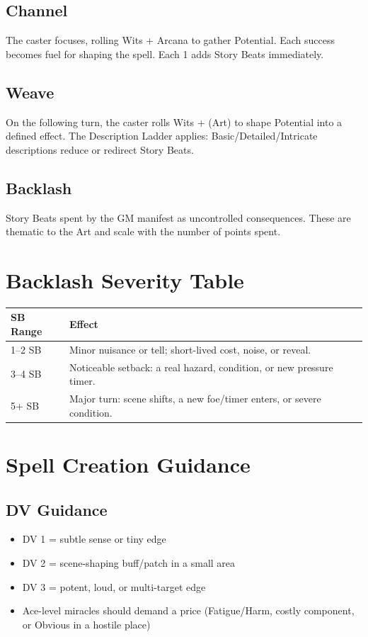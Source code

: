 \documentclass[11pt]{report}
\begin{document}
\subsection{Channel}
The caster focuses, rolling Wits + Arcana to gather Potential. Each success becomes fuel for shaping the spell. Each 1 adds Story Beats immediately.

\subsection{Weave}
On the following turn, the caster rolls Wits + (Art) to shape Potential into a defined effect. The Description Ladder applies: Basic/Detailed/Intricate descriptions reduce or redirect Story Beats.

\subsection{Backlash}
Story Beats spent by the GM manifest as uncontrolled consequences. These are thematic to the Art and scale with the number of points spent.

\section{Backlash Severity Table}

\begin{tabular}{|m{1in}|m{4in}|}
\hline
\textbf{SB Range} & \textbf{Effect} \\
\hline
1--2 SB & Minor nuisance or tell; short-lived cost, noise, or reveal. \\
\hline
3--4 SB & Noticeable setback: a real hazard, condition, or new pressure timer. \\
\hline
5+ SB & Major turn: scene shifts, a new foe/timer enters, or severe condition. \\
\hline
\end{tabular}

\section{Spell Creation Guidance}

\subsection{DV Guidance}
\begin{itemize}
    \item DV 1 = subtle sense or tiny edge
    \item DV 2 = scene-shaping buff/patch in a small area
    \item DV 3 = potent, loud, or multi-target edge
    \item Ace-level miracles should demand a price (Fatigue/Harm, costly component, or Obvious in a hostile place)
\end{itemize}
\end{document}

